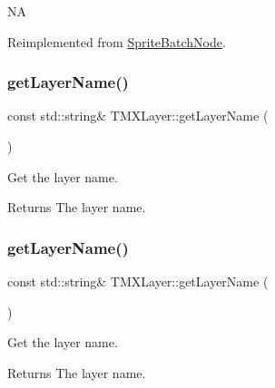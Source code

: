 NA 

Reimplemented from \hyperlink{classSpriteBatchNode_abaf755bc79646464f59b68b5a4fdc68c}{Sprite\+Batch\+Node}.

\mbox{\label{classTMXLayer_a83d5647317c7be079f5034530ec1eaab}} 
\subsubsection{\texorpdfstring{get\+Layer\+Name()}{getLayerName()}\hspace{0.1cm}{\footnotesize\ttfamily [1/2]}}
{\footnotesize\ttfamily const std\+::string\& T\+M\+X\+Layer\+::get\+Layer\+Name (\begin{DoxyParamCaption}{ }\end{DoxyParamCaption})\hspace{0.3cm}{\ttfamily [inline]}}

Get the layer name.

\begin{DoxyReturn}{Returns}
The layer name. 
\end{DoxyReturn}
\mbox{\label{classTMXLayer_a83d5647317c7be079f5034530ec1eaab}} 
\subsubsection{\texorpdfstring{get\+Layer\+Name()}{getLayerName()}\hspace{0.1cm}{\footnotesize\ttfamily [2/2]}}
{\footnotesize\ttfamily const std\+::string\& T\+M\+X\+Layer\+::get\+Layer\+Name (\begin{DoxyParamCaption}{ }\end{DoxyParamCaption})\hspace{0.3cm}{\ttfamily [inline]}}

Get the layer name.

\begin{DoxyReturn}{Returns}
The layer name. 
\end{DoxyReturn}
\mbox{\label{classTMXLayer_af461c95bbedda35e396ae3c7cc3d38f7}} 
